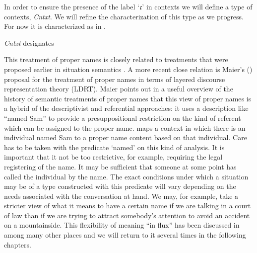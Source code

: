 In order to ensure the presence of the label `$\mathfrak{c}$' in
contexts we will define a type of contexts, \textit{Cntxt}.  We will
refine the characterization of this type as we progress.  For now it
is characterized as in \nexteg{}.
\begin{ex} 
  \textit{Cntxt} designates
  \begin{quote}
  \end{quote}
  
\end{ex} 
  

This treatment of proper names is closely related to treatments that were proposed earlier in situation semantics
\citep{GawronPeters1990,Cooper1991,BarwiseCooper1993}.  A more recent
close relation is Maier's (\citeyear{Maier2009}) proposal for the
treatment of proper names in terms of layered discourse representation
theory (LDRT).  Maier points out in a useful overview of the history
of semantic treatments of proper names that this view of proper
names is a hybrid of the descriptivist and referential approaches:
it uses a description like ``named Sam'' to provide a presuppositional
restriction on the kind of referent which can be assigned to the
proper name.  \preveg{}
maps a context in which there is an individual named Sam to a proper
name content based on that individual.  Care has to be taken with the
predicate `named' on this kind of analysis.  It is important that it
not be too restrictive, for example, requiring the legal registering
of the name.  It may be sufficient that someone at some point has
called the individual by the name.  The exact conditions under which a
situation may be of a type constructed with this predicate will vary
depending on the needs associated with the conversation at hand.  We
may, for example, take a stricter view of what it means to have a
certain name if we are talking in a court of law than if we are trying
to attract somebody's attention to avoid an accident on a
mountainside.  This flexibility of meaning ``in flux'' has been
discussed in \cite{CooperKempson2008,Cooper2012,Ludlow2014,GinzburgCooper2014,KrachtKlein2014} among many other
places and we will return to it several times in the following chapters.

